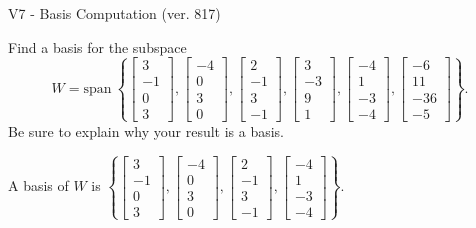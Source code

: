 \begin{exercise}
  \begin{exerciseTitle}V7 - Basis Computation (ver. 817)\end{exerciseTitle}
  \begin{exerciseStatement}
    Find a basis for the subspace 
\[W=\mathrm{span}\ \left\{\left[\begin{array}{r}
3 \\
-1 \\
0 \\
3
\end{array}\right] , \left[\begin{array}{r}
-4 \\
0 \\
3 \\
0
\end{array}\right] , \left[\begin{array}{r}
2 \\
-1 \\
3 \\
-1
\end{array}\right] , \left[\begin{array}{r}
3 \\
-3 \\
9 \\
1
\end{array}\right] , \left[\begin{array}{r}
-4 \\
1 \\
-3 \\
-4
\end{array}\right] , \left[\begin{array}{r}
-6 \\
11 \\
-36 \\
-5
\end{array}\right]\right\}.\]
 Be sure to explain why your result is a basis.


  \end{exerciseStatement}
  \begin{exerciseAnswer}
   A basis of \(W\) is  \(\left\{\left[\begin{array}{r}
3 \\
-1 \\
0 \\
3
\end{array}\right] , \left[\begin{array}{r}
-4 \\
0 \\
3 \\
0
\end{array}\right] , \left[\begin{array}{r}
2 \\
-1 \\
3 \\
-1
\end{array}\right] , \left[\begin{array}{r}
-4 \\
1 \\
-3 \\
-4
\end{array}\right]\right\}\).
  


  \end{exerciseAnswer}
\end{exercise}